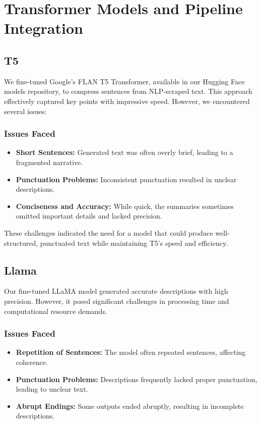 \documentclass[conference]{IEEEtran}
\begin{document}
\section{Transformer Models and Pipeline Integration}

    \subsection{T5}

    We fine-tuned Google's FLAN T5 Transformer, available in our Hugging Face models repository, to compress sentences from NLP-scraped text. This approach effectively captured key points with impressive speed. However, we encountered several issues:

    \subsubsection{Issues Faced}
    \begin{itemize}
        \item \textbf{Short Sentences:} Generated text was often overly brief, leading to a fragmented narrative.
        \item \textbf{Punctuation Problems:} Inconsistent punctuation resulted in unclear descriptions.
        \item \textbf{Conciseness and Accuracy:} While quick, the summaries sometimes omitted important details and lacked precision.
    \end{itemize}

    These challenges indicated the need for a model that could produce well-structured, punctuated text while maintaining T5's speed and efficiency.

    \subsection{Llama}

    Our fine-tuned LLaMA model generated accurate descriptions with high precision. However, it posed significant challenges in processing time and computational resource demands.

    \subsubsection{Issues Faced}
    \begin{itemize}
        \item \textbf{Repetition of Sentences:} The model often repeated sentences, affecting coherence.
        \item \textbf{Punctuation Problems:} Descriptions frequently lacked proper punctuation, leading to unclear text.
        \item \textbf{Abrupt Endings:} Some outputs ended abruptly, resulting in incomplete descriptions.
    \end{itemize}
\end{document}
